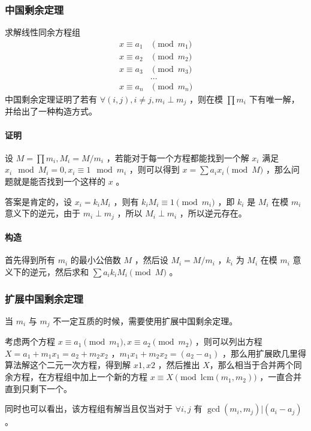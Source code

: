 \documentclass[UTF-8]{ctexart}
\newcommand{\cpp}[1]{\inputminted[bgcolor=bg,breaklines,breakanywhere=true]{c++}{#1}}
\begin{document}
			\cpp{code//Math//simgcd.cpp}
			\subsubsection{中国剩余定理}
			求解线性同余方程组
			\begin{align}
			x \equiv a _ 1 & \pmod {m _ 1} \nonumber \\ 
			x \equiv a _ 2 & \pmod {m _ 2} \nonumber \\
			x \equiv a _ 3 & \pmod {m _ 3} \nonumber \\
			&\dots\nonumber \\
			x \equiv a _ n & \pmod {m _ n} \nonumber
			\end{align}
			中国剩余定理证明了若有 $\forall (i,j) ,i \neq j,m _ i \perp m _ j$ ，则在模 $\prod m _ i$ 下有唯一解，并给出了一种构造方式。
			\paragraph{证明}设 $M=\prod m _ i,M _ i=M/m _ i$ ，若能对于每一个方程都能找到一个解 $x _ i$ 满足 $x _ i \mod M _ i=0,x _ i \equiv 1 \mod{m _ i }$ ，则可以得到 $x = \sum a _ i x _ i \pmod M$ ，那么问题就是能否找到一个这样的 $x$ 。  
	
			答案是肯定的，设 $x _ i=k _ i M _ i$ ，则有 $k _ i M _ i \equiv 1 \pmod {m_i}$ ，即 $k _ i$ 是 $M _ i$ 在模 $m _ i$ 意义下的逆元，由于 $m _ i \perp m _ j$ ，所以 $M _ i \perp m _ i$ ，所以逆元存在。
			\paragraph{构造}首先得到所有 $m _ i$ 的最小公倍数 $M$ ，然后设 $M _ i =M/m _ i$ ，$k _ i$ 为 $M _ i$ 在模 $m _ i$ 意义下的逆元，然后求和 $\sum a _ i k _ i M _ i \pmod M $ 。
	
			\subsubsection{扩展中国剩余定理}
			当 $m _ i$ 与 $m _  j$ 不一定互质的时候，需要使用扩展中国剩余定理。
	
			考虑两个方程 $x \equiv a _ 1 \pmod{m _ 1},x \equiv a _ 2 \pmod{m _ 2}$ ，则可以列出方程 $X=a _ 1+m _ 1x _ 1=a _ 2+m _ 2 x _ 2$ ，$m _ 1 x _ 1+m _ 2 x _ 2=(a _ 2-a _ 1)$ ，那么用扩展欧几里得算法解这个二元一次方程，得到解 $x1,x2$ ，然后推出 $X$，那么相当于合并两个同余方程，在方程组中加上一个新的方程 $x \equiv X \pmod{\mbox{lcm}(m _ 1,m _ 2)}$ ，一直合并直到只剩下一个。  
	
			同时也可以看出，该方程组有解当且仅当对于 $\forall i,j$ 有 $\gcd(m _ i,m _ j)|(a _ i-a _ j)$ 。
\end{document}
